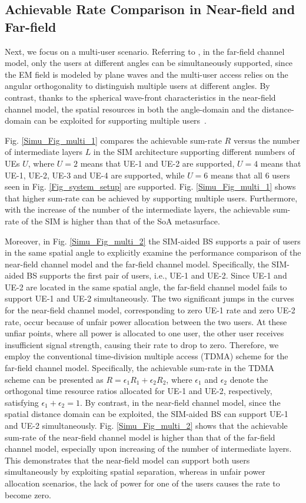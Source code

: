 \documentclass[lettersize,journal]{IEEEtran}
\theoremstyle{remark}
\begin{document}
\subsection{Achievable Rate Comparison in Near-field and Far-field}
Next, we focus on a multi-user scenario. Referring to \cite{wu2023multiple}, in the far-field channel model, only the users at different angles can be simultaneously supported, since the EM field is modeled by plane waves and the multi-user access relies on the angular orthogonality to distinguish multiple users at different angles. By contrast, thanks to the spherical wave-front characteristics in the near-field channel model, the spatial resources in both the angle-domain and the distance-domain can be exploited for supporting multiple users~\cite{an2023toward_beamfocusing}.

Fig. \ref{Simu_Fig_multi_1} compares the achievable sum-rate $R$ versus the number of intermediate layers $L$ in the SIM architecture supporting different numbers of UEs $U$, where $U=2$ means that UE-1 and UE-2 are supported, $U=4$ means that UE-1, UE-2, UE-3 and UE-4 are supported, while $U=6$ means that all 6 users seen in Fig. \ref{Fig_system_setup} are supported. Fig. \ref{Simu_Fig_multi_1} shows that higher sum-rate can be achieved by supporting multiple users. Furthermore, with the increase of the number of the intermediate layers, the achievable sum-rate of the SIM is higher than that of the SoA metasurface.

Moreover, in Fig. \ref{Simu_Fig_multi_2} the SIM-aided BS supports a pair of users in the same spatial angle to explicitly examine the performance comparison of the near-field channel model and the far-field channel model. Specifically, the SIM-aided BS supports the first pair of users, i.e., UE-1 and UE-2. Since UE-1 and UE-2 are located in the same spatial angle, the far-field channel model fails to support UE-1 and UE-2 simultaneously. The two significant jumps in the curves for the near-field channel model, corresponding to zero UE-1 rate and zero UE-2 rate, occur because of unfair power allocation between the two users. At these unfiar points, where all power is allocated to one user, the other user receives insufficient signal strength, causing their rate to drop to zero. Therefore, we employ the conventional time-division multiple access (TDMA) scheme for the far-field channel model. Specifically, the achievable sum-rate in the TDMA scheme can be presented as $R=\epsilon_1R_1+\epsilon_2R_2$, where $\epsilon_1$ and $\epsilon_2$ denote the orthogonal time resource ratios allocated for UE-1 and UE-2, respectively, satisfying $\epsilon_1+\epsilon_2=1$. By contrast, in the near-field channel model, since the spatial distance domain can be exploited, the SIM-aided BS can support UE-1 and UE-2 simultaneously. Fig. \ref{Simu_Fig_multi_2} shows that the achievable sum-rate of the near-field channel model is higher than that of the far-field channel model, especially upon increasing of the number of intermediate layers. This demonstrates that the near-field model can support both users simultaneously by exploiting spatial separation, whereas in unfair power allocation scenarios, the lack of power for one of the users causes the rate to become zero.
\end{document}
